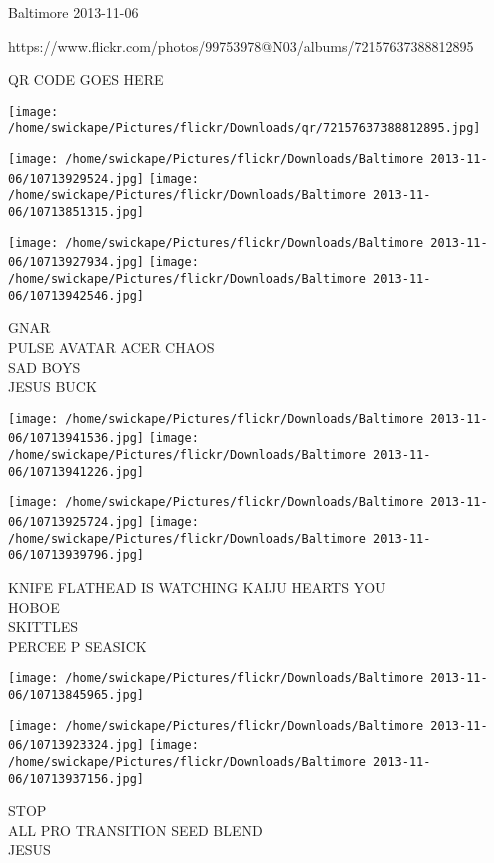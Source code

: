 \documentclass[10pt,letterpaper]{article}
\begin{document}
Baltimore 2013-11-06

https://www.flickr.com/photos/99753978@N03/albums/72157637388812895

QR CODE GOES HERE

\texttt{[image: /home/swickape/Pictures/flickr/Downloads/qr/72157637388812895.jpg]}
\pagebreak

\texttt{[image: /home/swickape/Pictures/flickr/Downloads/Baltimore 2013-11-06/10713929524.jpg]}
\texttt{[image: /home/swickape/Pictures/flickr/Downloads/Baltimore 2013-11-06/10713851315.jpg]}

\texttt{[image: /home/swickape/Pictures/flickr/Downloads/Baltimore 2013-11-06/10713927934.jpg]}
\texttt{[image: /home/swickape/Pictures/flickr/Downloads/Baltimore 2013-11-06/10713942546.jpg]}

GNAR\\
PULSE AVATAR ACER CHAOS\\
SAD BOYS\\
JESUS BUCK\\
\pagebreak

\texttt{[image: /home/swickape/Pictures/flickr/Downloads/Baltimore 2013-11-06/10713941536.jpg]}
\texttt{[image: /home/swickape/Pictures/flickr/Downloads/Baltimore 2013-11-06/10713941226.jpg]}

\texttt{[image: /home/swickape/Pictures/flickr/Downloads/Baltimore 2013-11-06/10713925724.jpg]}
\texttt{[image: /home/swickape/Pictures/flickr/Downloads/Baltimore 2013-11-06/10713939796.jpg]}

KNIFE FLATHEAD IS WATCHING KAIJU HEARTS YOU\\
HOBOE\\
SKITTLES\\
PERCEE P SEASICK\\
\pagebreak

\texttt{[image: /home/swickape/Pictures/flickr/Downloads/Baltimore 2013-11-06/10713845965.jpg]}

\vspace{0.25in}
\texttt{[image: /home/swickape/Pictures/flickr/Downloads/Baltimore 2013-11-06/10713923324.jpg]}
\texttt{[image: /home/swickape/Pictures/flickr/Downloads/Baltimore 2013-11-06/10713937156.jpg]}

STOP\\
ALL PRO TRANSITION SEED BLEND\\
JESUS\\
\pagebreak
\end{document}
